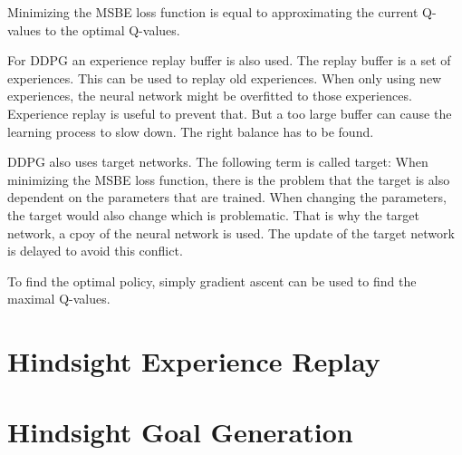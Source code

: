 Minimizing the MSBE loss function is equal to approximating the current Q-values to the optimal Q-values.

For DDPG an experience replay buffer is also used. The replay buffer is a set of experiences. This can be used to replay old experiences. When only using new experiences, the neural network might be overfitted to those experiences. Experience replay is useful to prevent that. But a too large buffer can cause the learning process to slow down. The right balance has to be found.

DDPG also uses target networks. The following term is called target:
When minimizing the MSBE loss function, there is the problem that the target is also dependent on the parameters that are trained. When changing the parameters, the target would also change which is problematic. That is why the target network, a cpoy of the neural network is used. The update of the target network is delayed to avoid this conflict.

To find the optimal policy, simply gradient ascent can be used to find the maximal Q-values.





\section{Hindsight Experience Replay}




\section{Hindsight Goal Generation}

